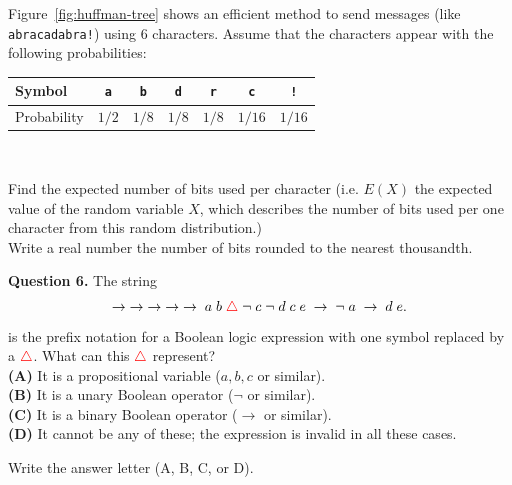 \documentclass[jou]{apa6}
\begin{document}
Figure~\ref{fig:huffman-tree} shows an efficient method to send messages
(like {\tt abracadabra!}) using $6$ characters.
Assume that the characters appear with the following probabilities:\\
{\small
\begin{tabular}{|l|c|c|c|c|c|c|} \hline
Symbol & {\tt a} & {\tt b} & {\tt d} & {\tt r} & {\tt c} & {\tt !} \\ \hline
Probability &  $1/2$ & $1/8$ & $1/8$ & $1/8$ & $1/16$ & $1/16$ \\ \hline
\end{tabular}\\
}
Find the expected number of bits used per character (i.e. $E(X)$ \textendash{} the expected value of
the random variable $X$, which describes the number of bits used per one
character from this random distribution.)\\
Write a real number \textendash{} the number of bits rounded to the nearest thousandth.




 
 


\vspace{10pt}
{\bf Question 6.} 
The string
$$\rightarrow\;\rightarrow\;\rightarrow\;\rightarrow\;\rightarrow\;a\;b\;\textcolor{red}{\triangle}\;\neg\;c\;\neg\;d\;c\;e\;\rightarrow\;\neg\;a\;\rightarrow\;d\;e.$$
is the prefix notation for a Boolean logic expression with one symbol replaced by a $\textcolor{red}{\triangle}$. 
What can this $\textcolor{red}{\triangle}$ represent?\\
{\bf (A)} It is a propositional variable ($a,b,c$ or similar).\\
{\bf (B)} It is a unary Boolean operator ($\neg$ or similar).\\
{\bf (C)} It is a binary Boolean operator ($\rightarrow$ or similar).\\
{\bf (D)} It cannot be any of these; the expression is invalid in all these cases.

Write the answer letter (A, B, C, or D).
\end{document}

